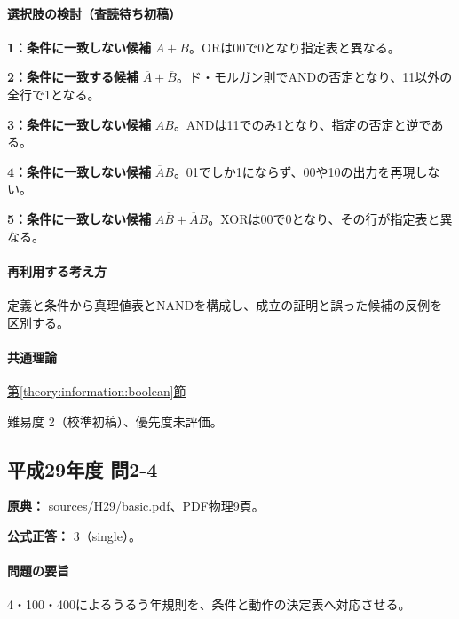 \paragraph{選択肢の検討（査読待ち初稿）}\mbox{}\par

\noindent\textbf{1：条件に一致しない候補} \(A+B\)。ORは00で0となり指定表と異なる。\par

\noindent\textbf{2：条件に一致する候補} \(\overline A+\overline B\)。ド・モルガン則でANDの否定となり、11以外の全行で1となる。\par

\noindent\textbf{3：条件に一致しない候補} \(AB\)。ANDは11でのみ1となり、指定の否定と逆である。\par

\noindent\textbf{4：条件に一致しない候補} \(\overline A B\)。01でしか1にならず、00や10の出力を再現しない。\par

\noindent\textbf{5：条件に一致しない候補} \(A\overline B+\overline A B\)。XORは00で0となり、その行が指定表と異なる。\par

\paragraph{再利用する考え方} 定義と条件から真理値表とNANDを構成し、成立の証明と誤った候補の反例を区別する。

\paragraph{共通理論} \hyperref[theory:information:boolean]{第\ref*{theory:information:boolean}節}

\par 難易度 2（校準初稿）、優先度未評価。

\subsection{平成29年度 問2-4}
\label{q:h29-reg-basic-2-4}

\noindent\textbf{原典：} sources/H29/basic.pdf、PDF物理9頁。

\textbf{公式正答：} 3（single）。

\paragraph{問題の要旨} 4・100・400によるうるう年規則を、条件と動作の決定表へ対応させる。

